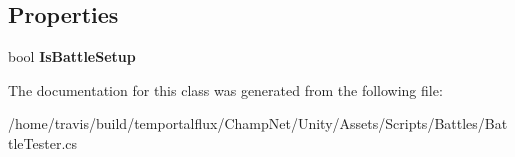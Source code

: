 \subsection*{Properties}
\begin{DoxyCompactItemize}
\item 
\hypertarget{class_battle_tester_afb877324567ebd5ac0d4f5372006d0fa}{bool {\bfseries Is\-Battle\-Setup}}\label{class_battle_tester_afb877324567ebd5ac0d4f5372006d0fa}

\end{DoxyCompactItemize}


The documentation for this class was generated from the following file\-:\begin{DoxyCompactItemize}
\item 
/home/travis/build/temportalflux/\-Champ\-Net/\-Unity/\-Assets/\-Scripts/\-Battles/Battle\-Tester.\-cs\end{DoxyCompactItemize}
